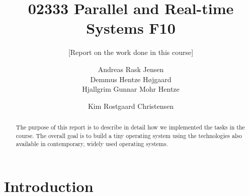 \documentclass{acm_proc_article-sp}
\begin{document}
\title{02333 Parallel and Real-time Systems F10}
\subtitle{[Report on the work done in this course]
}

\author{
\alignauthor
Andreas Rask Jensen\\
\alignauthor
Demmus Hentze Højgaard\\
\alignauthor
Hjallgrim Gunnar Mohr Hentze\\
\and  %
\alignauthor 
Kim Rostgaard Christensen\\
}

\maketitle

\begin{abstract}
The purpose of this report is to describe in detail how we implemented the tasks in the course. The overall goal is to build a tiny operating system using the technologies also available in contemporary, widely used operating systems.
\end{abstract}





\section{Introduction}


%
\end{document}
